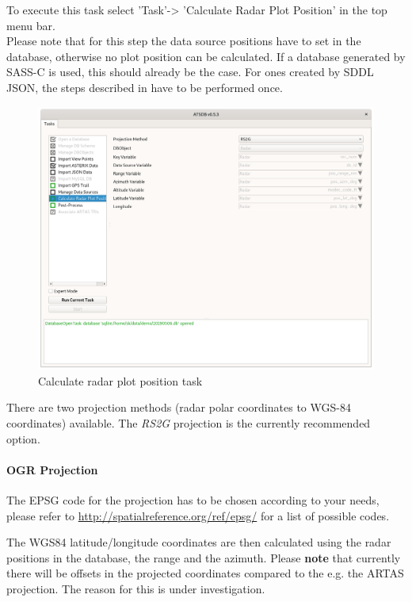 {To execute this task select 'Task'->  'Calculate Radar Plot Position' in the top menu bar. \\

Please note that for this step the data source positions have to set in the database, otherwise no plot position can be calculated. If a database generated by SASS-C is used, this should already be the case. For ones created by SDDL JSON, the steps described in  have to be performed once.

\begin{figure}[H]
  \center
    \includegraphics[width=14cm,frame]{../screenshots/task_calc_radar.png}
  \caption{Calculate radar plot position task}
  \label{fig:task_calc_radar}
\end{figure}

There are two projection methods (radar polar coordinates to WGS-84 coordinates) available. The \textit{RS2G} projection is the currently recommended option.

\paragraph{OGR Projection}

The EPSG code for the projection has to be chosen according to your needs, please refer to \url{http://spatialreference.org/ref/epsg/} for a list of possible codes.

The WGS84 latitude/longitude coordinates are then calculated using the radar positions in the database, the range and the azimuth. Please \textbf{note} that currently there will be offsets in the projected coordinates compared to the e.g. the ARTAS projection. The reason for this is under investigation.

}
